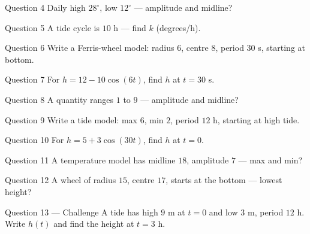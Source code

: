 \documentclass[11pt]{article}
\begin{document}
\begin{qbox}{Question 4}
Daily high $28^\circ$, low $12^\circ$ — amplitude and midline?\workspace{2.4cm}
\end{qbox}

\begin{qbox}{Question 5}
A tide cycle is $10$ h — find $k$ (degrees/h).\workspace{2.4cm}
\end{qbox}

\begin{qbox}{Question 6}
Write a Ferris-wheel model: radius $6$, centre $8$, period $30$ s, starting at bottom.\workspace{2.4cm}
\end{qbox}

\begin{qbox}{Question 7}
For $h=12-10\cos(6t)$, find $h$ at $t=30$ s.\workspace{2.4cm}
\end{qbox}

\begin{qbox}{Question 8}
A quantity ranges $1$ to $9$ — amplitude and midline?\workspace{2.4cm}
\end{qbox}

\begin{qbox}{Question 9}
Write a tide model: max $6$, min $2$, period $12$ h, starting at high tide.\workspace{2.4cm}
\end{qbox}

\begin{qbox}{Question 10}
For $h=5+3\cos(30t)$, find $h$ at $t=0$.\workspace{2.4cm}
\end{qbox}

\begin{qbox}{Question 11}
A temperature model has midline $18$, amplitude $7$ — max and min?\workspace{2.4cm}
\end{qbox}

\begin{qbox}{Question 12}
A wheel of radius $15$, centre $17$, starts at the bottom — lowest height?\workspace{2.4cm}
\end{qbox}

\begin{qbox}{Question 13 --- Challenge}
A tide has high $9$ m at $t=0$ and low $3$ m, period $12$ h. Write $h(t)$ and find the height at $t=3$ h.\workspace{3.4cm}
\end{qbox}

\clearpage
{}
\end{document}

